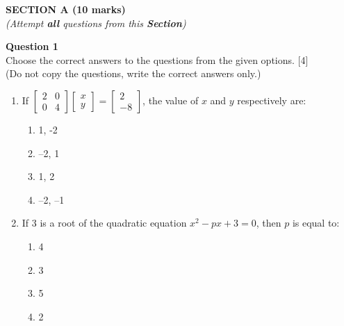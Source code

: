 \begin{center}
   \large
   \textbf{SECTION A (10 marks)}\\
   \vspace{5mm}
   \normalsize
   \textit{(Attempt \textbf{all} questions from this \textbf{Section})}
\end{center}
\par
\noindent
\textbf{Question 1}\\
Choose the correct answers to the questions from the given options. \hfill [4]\\
(Do not copy the questions, write the correct answers only.)
\par
\vspace{2mm}
\begin{enumerate}[label=(\roman*)]

    \item If $\begin{bmatrix}
                  2 & 0\\ 
                  0 & 4
              \end{bmatrix}
              \begin{bmatrix}
                  x \\ 
                  y
              \end{bmatrix} = 
              \begin{bmatrix}
                  2 \\ 
                  -8
              \end{bmatrix}$, the value of $x$ and $y$ respectively are:

        \begin{enumerate}[label=(\alph*)]
            \item 1, -2
            \item –2, 1
            \item 1, 2
            \item –2, –1
        \end{enumerate}

    \newpage
    \item If 3 is a root of the quadratic equation $x^2 - px + 3 = 0$, then $p$ is equal to:

        \begin{enumerate}[label=(\alph*)]
            \item 4
            \item 3
            \item 5
            \item 2
        \end{enumerate}


\end{enumerate}
